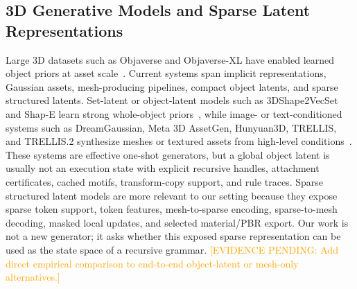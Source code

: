 \documentclass[sigconf,anonymous,review]{acmart}
\providecommand{\EvidencePending}[1]{\textcolor{orange}{[EVIDENCE PENDING: #1]}}
\begin{document}
\subsection{3D Generative Models and Sparse Latent Representations}
Large 3D datasets such as Objaverse and Objaverse-XL have enabled learned object priors at asset scale~\cite{objaverse2023,objaverseXL2023}. Current systems span implicit representations, Gaussian assets, mesh-producing pipelines, compact object latents, and sparse structured latents. Set-latent or object-latent models such as 3DShape2VecSet and Shap-E learn strong whole-object priors~\cite{shape2vecset2023,shapE2023}, while image- or text-conditioned systems such as DreamGaussian, Meta 3D AssetGen, Hunyuan3D, TRELLIS, and TRELLIS.2 synthesize meshes or textured assets from high-level conditions~\cite{dreamgaussian2023,assetgen2024,hunyuan3d2025,trellis2024,trellis2project}. These systems are effective one-shot generators, but a global object latent is usually not an execution state with explicit recursive handles, attachment certificates, cached motifs, transform-copy support, and rule traces. Sparse structured latent models are more relevant to our setting because they expose sparse token support, token features, mesh-to-sparse encoding, sparse-to-mesh decoding, masked local updates, and selected material/PBR export. Our work is not a new generator; it asks whether this exposed sparse representation can be used as the state space of a recursive grammar. \EvidencePending{Add direct empirical comparison to end-to-end object-latent or mesh-only alternatives.}
\end{document}
